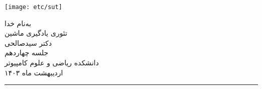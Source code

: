 \begin{minipage}{0.1\textwidth}
    \texttt{[image: etc/sut]}
    \end{minipage}%
    \hspace{1.65cm}
    \begin{minipage}{0.5\textwidth}\centering
    \fontsize{10pt}{10pt}\selectfont
    به‌نام خدا \\
    تئوری یادگیری ماشین \\
    دکتر سیدصالحی \\
    جلسه چهاردهم \\
    \vspace{0.25cm}
    \begingroup
    \fontsize{8pt}{8pt}\selectfont
    دانشکده ریاضی و علوم کامپیوتر \\
    اردیبهشت ماه ۱۴۰۳ \\
    \endgroup
    \end{minipage}%
    \hfill%
    \begin{minipage}{0.1\textwidth}
    \end{minipage}
    
    \vspace{0.5cm}
    
    \noindent\rule{\textwidth}{1pt}